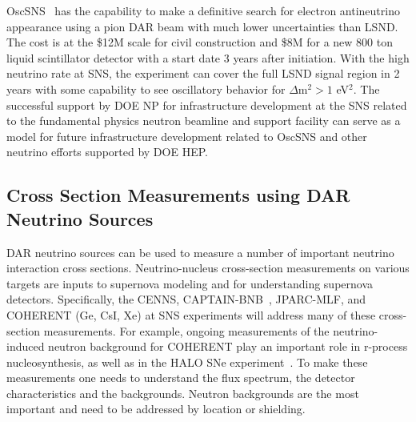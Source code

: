 
\noindent OscSNS~\cite{OscSNS} has the capability to make a definitive search for electron antineutrino appearance using a pion DAR beam with much lower uncertainties than LSND. The cost is at the \$12M scale for civil construction and \$8M for a new 800 ton liquid scintillator detector with a start date 3 years after initiation.  With the high neutrino rate at SNS, the experiment can cover the full LSND signal region in 2 years with some capability to see oscillatory behavior for $\Delta$m$^2 > 1$ eV$^2$.  The successful support by DOE NP for infrastructure development at the SNS related to the fundamental physics neutron beamline and support facility can serve as a model for future infrastructure development related to OscSNS and other neutrino efforts supported by DOE HEP.

\subsection{Cross Section Measurements using DAR Neutrino Sources}

\noindent DAR neutrino sources can be used to measure a number of
important neutrino interaction cross sections.  Neutrino-nucleus
cross-section measurements on various targets are inputs to supernova
modeling and for understanding supernova detectors. Specifically, the
CENNS, CAPTAIN-BNB~\cite{Berns:2013usa}, JPARC-MLF, and COHERENT (Ge,
CsI, Xe) at SNS experiments will address many of these cross-section
measurements. For example, ongoing measurements of the
neutrino-induced neutron background for COHERENT play an important
role in r-process nucleosynthesis, as well as in the HALO SNe
experiment~\cite{halo}. To make these measurements one needs to
understand the flux spectrum, the detector characteristics and the
backgrounds. Neutron backgrounds are the most important and need to be
addressed by location or shielding.
